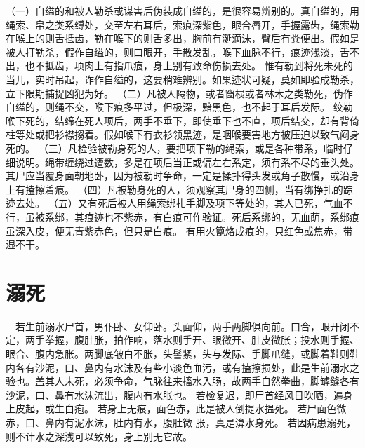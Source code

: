 \documentclass[12pt,UTF8]{ctexbook}
\begin{document}
（一）自缢的和被人勒杀或谋害后伪装成自缢的，是很容易辨别的。真自缢的，用绳索、帛之类系缚处，交至左右耳后，索痕深紫色，眼合唇开，手握露齿，绳索勒在喉上的则舌抵齿，勒在喉下的则舌多出，胸前有涎滴沫，臀后有粪便出。假如是被人打勒杀，假作自缢的，则口眼开，手散发乱，喉下血脉不行，痕迹浅淡，舌不出，也不抵齿，项肉上有指爪痕，身上别有致命伤损去处。
惟有勒到将死未死的当儿，实时吊起，诈作自缢的，这要稍难辨别。如果迹状可疑，莫如即验成勒杀，立下限期捕捉凶犯为好。
（二）凡被人隔物，或者窗棂或者林木之类勒死，伪作自缢的，则绳不交，喉下痕多平过，但极深，黯黑色，也不起于耳后发际。
绞勒喉下死的，结缔在死人项后，两手不垂下，即使垂下也不直，项后结交，却有背倚柱等处或把衫襟搊着。假如喉下有衣衫领黑迹，是咽喉要害地方被压迫以致气闷身死的。
（三）凡检验被勒身死的人，要把项下勒的绳索，或是各种带系，临时仔细说明。绳带缠绕过遭数，多是在项后当正或偏左右系定，须有系不尽的垂头处。其尸应当覆身面朝地卧，因为被勒时争命，一定是揉扑得头发或角子散慢，或沿身上有搕擦着痕。
（四）凡被勒身死的人，须观察其尸身的四侧，当有绑挣扎的踪迹去处。
（五）又有死后被人用绳索绑扎手脚及项下等处的，其人已死，气血不行，虽被系绑，其痕迹也不紫赤，有白痕可作验证。死后系绑的，无血荫，系绑痕虽深入皮，便无青紫赤色，但只是白痕。
有用火篦烙成痕的，只红色或焦赤，带湿不干。


\chapter{溺死}



　若生前溺水尸首，男仆卧、女仰卧。头面仰，两手两脚俱向前。口合，眼开闭不定，两手拳握，腹肚胀，拍作响，落水则手开、眼微开、肚皮微胀；投水则手握、眼合、腹内急胀。两脚底皱白不胀，头髻紧，头与发际、手脚爪缝，或脚着鞋则鞋内各有沙泥，口、鼻内有水沫及有些小淡色血污，或有搕擦损处，此是生前溺水之验也。盖其人未死，必须争命，气脉往来搐水入肠，故两手自然拳曲，脚罅缝各有沙泥，口、鼻有水沫流出，腹内有水胀也。
若检复迟，即尸首经风日吹晒，遍身上皮起，或生白疱。
若身上无痕，面色赤，此是被人倒提水揾死。
若尸面色微赤，口、鼻内有泥水沫，肚内有水，腹肚微 胀，真是渰水身死。
若因病患溺死，则不计水之深浅可以致死，身上别无它故。
\end{document}
